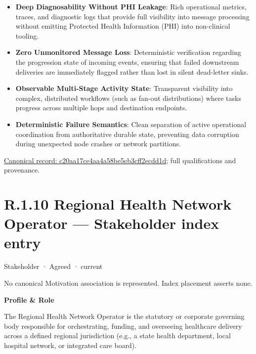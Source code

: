 \begin{itemize}


\item \textbf{Deep Diagnosability Without PHI Leakage}: Rich operational metrics, traces, and diagnostic logs that provide full visibility into message processing without emitting Protected Health Information (PHI) into non-clinical tooling.

\item \textbf{Zero Unmonitored Message Loss}: Deterministic verification regarding the progression state of incoming events, ensuring that failed downstream deliveries are immediately flagged rather than lost in silent dead-letter sinks.

\item \textbf{Observable Multi-Stage Activity State}: Transparent visibility into complex, distributed workflows (such as fan-out distributions) where tasks progress across multiple hops and destination endpoints.

\item \textbf{Deterministic Failure Semantics}: Clean separation of active operational coordination from authoritative durable state, preventing data corruption during unexpected node crashes or network partitions.

\end{itemize}

{\footnotesize \href{../../../../continuum/motivation/stakeholder/c20aa17ce4aa4a58be5eb3cff2ecdd1d.md}{Canonical record: c20aa17ce4aa4a58be5eb3cff2ecdd1d}; full qualifications and provenance.}\par
\section*{R.1.10 Regional Health Network Operator — Stakeholder index entry}
\label{navigation:R.1.10}

\label{element:e76216c494fa4500bb80eda6f83513c1}
{\small Stakeholder · Agreed · current}\par
No canonical Motivation association is represented. Index placement asserts none.\par

\par\medskip\textbf{Profile \& Role}\par


The Regional Health Network Operator is the statutory or corporate governing body responsible for orchestrating, funding, and overseeing healthcare delivery across a defined regional jurisdiction (e.g., a state health department, local hospital network, or integrated care board).



